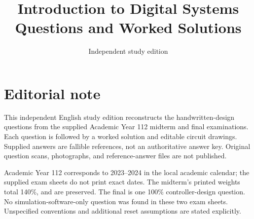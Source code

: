 \documentclass[11pt,a4paper,oneside]{book}
\title{Introduction to Digital Systems\\Questions and Worked Solutions}
\author{Independent study edition}
\date{}
\begin{document}
\frontmatter
\maketitle
\chapter*{Editorial note}
This independent English study edition reconstructs the handwritten-design questions from the supplied Academic Year 112 midterm and final examinations. Each question is followed by a worked solution and editable circuit drawings. Supplied answers are fallible references, not an authoritative answer key. Original question scans, photographs, and reference-answer files are not published.

Academic Year 112 corresponds to 2023--2024 in the local academic calendar; the supplied exam sheets do not print exact dates. The midterm's printed weights total 140\%, and are preserved. The final is one 100\% controller-design question. No simulation-software-only question was found in these two exam sheets. Unspecified conventions and additional reset assumptions are stated explicitly.
\tableofcontents
\mainmatter


\end{document}
